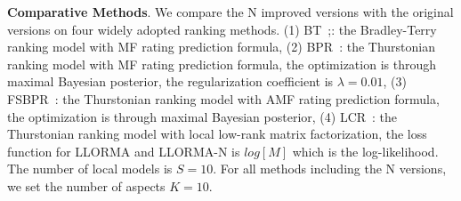 \documentclass[letterpaper]{article} %
\begin{document}
\textbf{Comparative Methods}. We compare the N improved versions with the original versions on four widely adopted ranking methods. (1) BT~\cite{Hu2016Improved};: the Bradley-Terry ranking model with MF rating prediction formula, (2) BPR~\cite{Rendle2009BPR}:  the Thurstonian ranking model with MF rating prediction formula, the optimization is through maximal Bayesian posterior, the regularization coefficient is $\lambda=0.01$, (3) FSBPR~\cite{Zhao2018Factored}: the Thurstonian ranking model with AMF rating prediction formula, the optimization is through maximal Bayesian posterior, (4) LCR~\cite{Lee2014Local}: the Thurstonian ranking model with local low-rank matrix factorization, the loss function for LLORMA and LLORMA-N is $log[M]$ which is the log-likelihood. The number of local models  is $S=10$.  For all methods including the N versions, we set the number of aspects $K=10$. 
\end{document}
